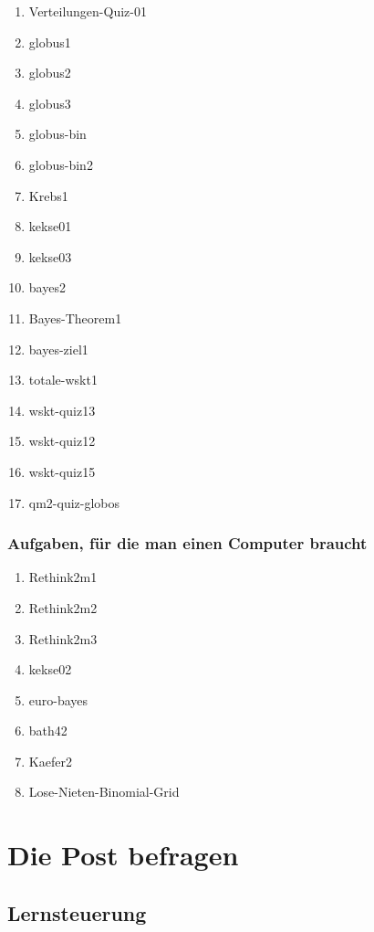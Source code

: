 \documentclass[
  ngerman,
  letterpaper,
  twoside,
  open=any]{scrbook}
\providecommand{\tightlist}{%
  \setlength{\itemsep}{0pt}\setlength{\parskip}{0pt}}\usepackage{longtable,booktabs,array}
\theoremstyle{definition}
\theoremstyle{plain}
\theoremstyle{definition}
\theoremstyle{definition}
\theoremstyle{definition}
\theoremstyle{definition}
\theoremstyle{remark}
\begin{document}
\begin{enumerate}
\def\labelenumi{\arabic{enumi}.}
\tightlist
\item
  Verteilungen-Quiz-01
\item
  globus1
\item
  globus2
\item
  globus3
\item
  globus-bin
\item
  globus-bin2
\item
  Krebs1
\item
  kekse01
\item
  kekse03
\item
  bayes2
\item
  Bayes-Theorem1
\item
  bayes-ziel1
\item
  totale-wskt1
\item
  wskt-quiz13
\item
  wskt-quiz12
\item
  wskt-quiz15
\item
  qm2-quiz-globos
\end{enumerate}

\subsection{Aufgaben, für die man einen Computer
braucht}\label{aufgaben-fuxfcr-die-man-einen-computer-braucht-4}

\begin{enumerate}
\def\labelenumi{\arabic{enumi}.}
\setcounter{enumi}{1}
\tightlist
\item
  Rethink2m1
\item
  Rethink2m2
\item
  Rethink2m3
\item
  kekse02
\item
  euro-bayes
\item
  bath42
\item
  Kaefer2
\item
  Lose-Nieten-Binomial-Grid
\end{enumerate}

\chapter{Die Post befragen}\label{die-post-befragen}

\section{Lernsteuerung}\label{lernsteuerung-6}
\end{document}
